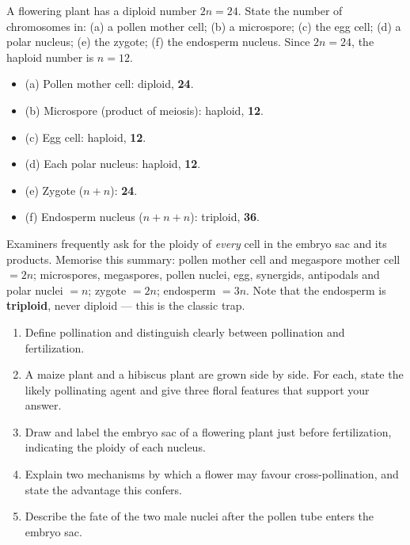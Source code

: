 \documentclass[11pt]{article}
\begin{document}
\begin{exoresolu}
A flowering plant has a diploid number $2n = 24$. State the number of chromosomes in: (a) a pollen mother cell; (b) a microspore; (c) the egg cell; (d) a polar nucleus; (e) the zygote; (f) the endosperm nucleus.
\tcblower
Since $2n = 24$, the haploid number is $n = 12$.
\begin{itemize}
\item (a) Pollen mother cell: diploid, \textbf{24}.
\item (b) Microspore (product of meiosis): haploid, \textbf{12}.
\item (c) Egg cell: haploid, \textbf{12}.
\item (d) Each polar nucleus: haploid, \textbf{12}.
\item (e) Zygote ($n + n$): \textbf{24}.
\item (f) Endosperm nucleus ($n + n + n$): triploid, \textbf{36}.
\end{itemize}
\end{exoresolu}

\begin{attention}
Examiners frequently ask for the ploidy of \emph{every} cell in the embryo sac and its products. Memorise this summary: pollen mother cell and megaspore mother cell $= 2n$; microspores, megaspores, pollen nuclei, egg, synergids, antipodals and polar nuclei $= n$; zygote $= 2n$; endosperm $= 3n$. Note that the endosperm is \textbf{triploid}, never diploid --- this is the classic trap.
\end{attention}

\begin{exercice}
\begin{enumerate}
\item Define pollination and distinguish clearly between pollination and fertilization.
\item A maize plant and a hibiscus plant are grown side by side. For each, state the likely pollinating agent and give three floral features that support your answer.
\item Draw and label the embryo sac of a flowering plant just before fertilization, indicating the ploidy of each nucleus.
\item Explain two mechanisms by which a flower may favour cross-pollination, and state the advantage this confers.
\item Describe the fate of the two male nuclei after the pollen tube enters the embryo sac.
\end{enumerate}
\end{exercice}
\end{document}
